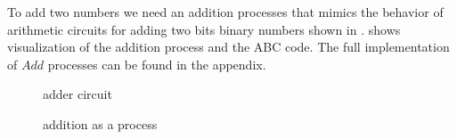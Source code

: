 To add two numbers we need an addition processes that mimics the behavior of arithmetic circuits for adding two bits binary numbers shown in 
.
 shows visualization of the addition process and the ABC code.
The full implementation of $Add$ processes can be found in the appendix.
\begin{figure}[H]%
\centering
{}
\caption{adder circuit}
\label{tra_adder_circuit}%
\end{figure}


\begin{figure}[H]%
\centering
\hspace{\fill}
%
\hspace{1em}%
%
\vspace{2em}
%
\caption{addition as a process}
\label{tra_addition}%
\end{figure}

